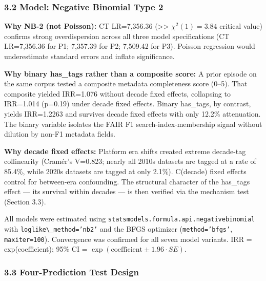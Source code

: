 \subsubsection{3.2 Model: Negative Binomial Type 2}

\textbf{Why NB-2 (not Poisson):} CT LR=7,356.36 (>> $\chi^{2}(1)=3.84$ critical value) confirms strong overdispersion across all three model specifications (CT LR=7,356.36 for P1; 7,357.39 for P2; 7,509.42 for P3). Poisson regression would underestimate standard errors and inflate significance.

\textbf{Why binary has\_tags rather than a composite score:} A prior episode on the same corpus tested a composite metadata completeness score (0--5). That composite yielded IRR=1.076 without decade fixed effects, collapsing to IRR=1.014 (p=0.19) under decade fixed effects. Binary has\_tags, by contrast, yields IRR=1.2263 and survives decade fixed effects with only 12.2\% attenuation. The binary variable isolates the FAIR F1 search-index-membership signal without dilution by non-F1 metadata fields.

\textbf{Why decade fixed effects:} Platform era shifts created extreme decade-tag collinearity (Cramér's V=0.823; nearly all 2010s datasets are tagged at a rate of 85.4\%, while 2020s datasets are tagged at only 2.1\%). C(decade) fixed effects control for between-era confounding. The structural character of the has\_tags effect --- its survival within decades --- is then verified via the mechanism test (Section 3.3).

All models were estimated using \texttt{statsmodels.formula.api.negativebinomial} with \texttt{loglike\textbackslash \_method='nb2'} and the BFGS optimizer (\texttt{method='bfgs'}, \texttt{maxiter=100}). Convergence was confirmed for all seven model variants. IRR = exp(coefficient); 95\% CI = $\exp(\text{coefficient} \pm 1.96\cdot SE)$.

\subsubsection{3.3 Four-Prediction Test Design}

